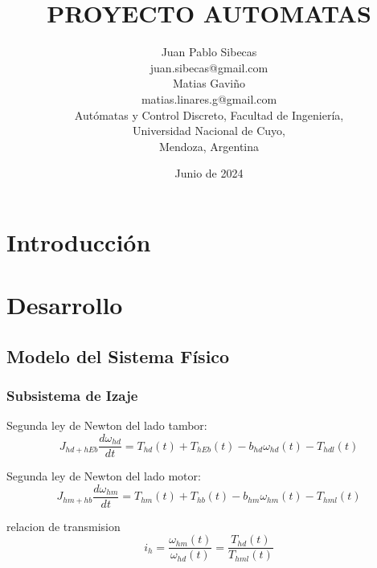 \documentclass{article}
\title{PROYECTO AUTOMATAS}
\author{Juan Pablo Sibecas \\ juan.sibecas@gmail.com \\Matias Gaviño\\ matias.linares.g@gmail.com \\ Autómatas y Control Discreto, Facultad de Ingeniería, \\ Universidad Nacional de Cuyo, \\ Mendoza, Argentina}
\date{Junio de 2024}
\begin{document}
\renewcommand{\tablename}{Tabla}

\maketitle

\begin{abstract}\label{sec:abstract}

\end{abstract}

\newpage

\section{Introducción} \label{sec:intro}

\section{Desarrollo} \label{sec:desarrollo}
    \subsection{Modelo del Sistema Físico} \label{sec:plantModel}

        \subsubsection{Subsistema de Izaje}
            Segunda ley de Newton del lado tambor:
            \begin{equation} \label{eq:tamborIzaje}
                J_{hd+hEb} \frac{d \omega_{hd}}{dt} = T_{hd}(t) + T_{hEb}(t) - b_{hd} \omega_{hd}(t) - T_{hdl}(t)
            \end{equation}

            Segunda ley de Newton del lado motor:
            \begin{equation} \label{eq:motorIzaje}
                J_{hm+hb} \frac{d \omega_{hm}}{dt} = T_{hm}(t) + T_{hb}(t) - b_{hm} \omega_{hm}(t) - T_{hml}(t)
            \end{equation}

            relacion de transmision
            \begin{equation} \label{eq:transmisionIzaje}
                i_h = \frac{\omega_{hm}(t)}{\omega_{hd}(t)} = \frac{T_{hd}(t)}{T_{hml}(t)}
            \end{equation}
\end{document}
